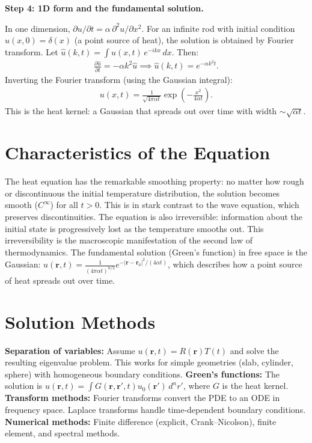 \documentclass[11pt,openright]{book}
\begin{document}
\textbf{Step 4: 1D form and the fundamental solution.}

In one dimension, $\partial u/\partial t = \alpha\,\partial^2 u/\partial x^2$. For an infinite rod with initial condition $u(x, 0) = \delta(x)$ (a point source of heat), the solution is obtained by Fourier transform. Let $\hat{u}(k, t) = \int u(x, t)\,e^{-ikx}\,dx$. Then:
\begin{align}
\frac{\partial\hat{u}}{\partial t} = -\alpha k^2\hat{u} \implies \hat{u}(k, t) = e^{-\alpha k^2 t}.
\end{align}
Inverting the Fourier transform (using the Gaussian integral):
\begin{align}
u(x, t) = \frac{1}{\sqrt{4\pi\alpha t}}\exp\!\left(-\frac{x^2}{4\alpha t}\right).
\end{align}
This is the heat kernel: a Gaussian that spreads out over time with width $\sim\sqrt{\alpha t}$.

\section*{Characteristics of the Equation}

The heat equation has the remarkable smoothing property: no matter how rough or discontinuous the initial temperature distribution, the solution becomes smooth ($C^\infty$) for all $t > 0$. This is in stark contrast to the wave equation, which preserves discontinuities. The equation is also irreversible: information about the initial state is progressively lost as the temperature smooths out. This irreversibility is the macroscopic manifestation of the second law of thermodynamics. The fundamental solution (Green's function) in free space is the Gaussian: $u(\mathbf{r}, t) = \frac{1}{(4\pi\alpha t)^{n/2}}e^{-|\mathbf{r}-\mathbf{r}_0|^2/(4\alpha t)}$, which describes how a point source of heat spreads out over time.
\section*{Solution Methods}

\textbf{Separation of variables:} Assume $u(\mathbf{r}, t) = R(\mathbf{r})T(t)$ and solve the resulting eigenvalue problem. This works for simple geometries (slab, cylinder, sphere) with homogeneous boundary conditions. \textbf{Green's functions:} The solution is $u(\mathbf{r}, t) = \int G(\mathbf{r}, \mathbf{r}', t) u_0(\mathbf{r}')\,d^n r'$, where $G$ is the heat kernel. \textbf{Transform methods:} Fourier transforms convert the PDE to an ODE in frequency space. Laplace transforms handle time-dependent boundary conditions. \textbf{Numerical methods:} Finite difference (explicit, Crank--Nicolson), finite element, and spectral methods.
\end{document}
